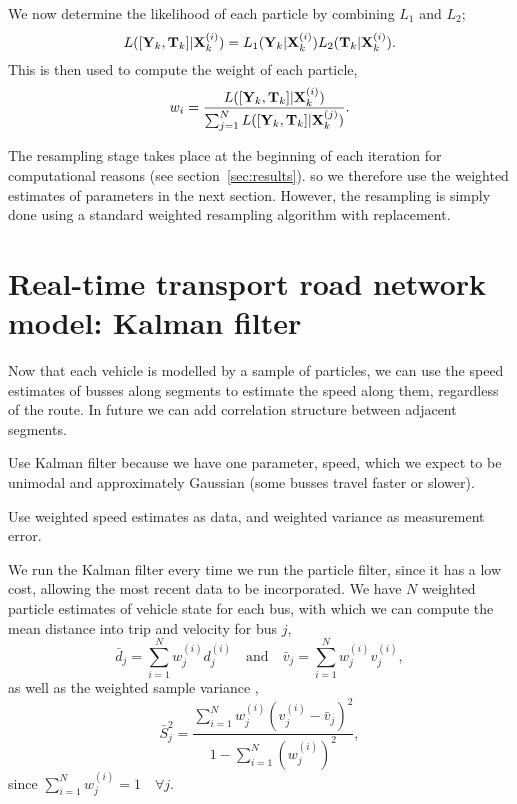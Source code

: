 \documentclass[draftcls,a4paper,onecolumn]{IEEEtran}\usepackage[]{graphicx}\usepackage[]{color}
\begin{document}
We now determine the likelihood of each particle by combining $L_1$ and $L_2$;
\begin{equation}
  \label{eq:particle_likelihood}
  L ([\mathbf{Y}_k, \mathbf{T}_k] | \mathbf{X}_k^{(i)}) = L_1(\mathbf{Y}_k|\mathbf{X}_k^{(i)}) L_2(\mathbf{T}_k | \mathbf{X}_k^{(i)}).
\end{equation}
This is then used to compute the weight of each particle,
\begin{equation}
  \label{eq:particle_weights}
  w_i = \frac{L ([\mathbf{Y}_k, \mathbf{T}_k] | \mathbf{X}_k^{(i)})}{\sum_{j=1}^N   L ([\mathbf{Y}_k, \mathbf{T}_k] | \mathbf{X}_k^{(j)})}.
\end{equation}

The resampling stage takes place at the beginning of each iteration for computational 
reasons (see section~\ref{sec:results}).
so we therefore use the weighted estimates of parameters in the next section.
However, the resampling is simply done using a standard weighted resampling 
algorithm with replacement.


\section{Real-time transport road network model: Kalman filter}
\label{sec:kf}

Now that each vehicle is modelled by a sample of particles,
we can use the speed estimates of busses along segments to estimate
the speed along them, regardless of the route.
In future we can add correlation structure between adjacent segments.

Use Kalman filter because we have one parameter, speed, 
which we expect to be unimodal and approximately Gaussian
(some busses travel faster or slower).

Use weighted speed estimates as data,
and weighted variance as measurement error.


We run the Kalman filter every time we run the particle filter,
since it has a low cost, allowing the most recent data to be incorporated.
We have $N$ weighted particle estimates of vehicle state for each bus,
with which we can compute the mean distance into trip and velocity for bus $j$,
\begin{equation}
  \label{eq:weighted_mean}
  \bar d_j = \sum_{i=1}^N w_j^{(i)} d_j^{(i)} \quad\text{and}\quad
  \bar v_j = \sum_{i=1}^N w_j^{(i)} v_j^{(i)},
\end{equation}
as well as the weighted sample variance \cite{cn},
\begin{equation}
  \label{eq:weighted_variance}
  \bar S_j^2 = \frac{\sum_{i=1}^N w_j^{(i)} (v_j^{(i)} - \bar v_j)^2}{1 - \sum_{i=1}^N (w_j^{(i)})^2},
\end{equation}
since $\sum_{i=1}^N w_j^{(i)} = 1\quad \forall j$.
\end{document}
